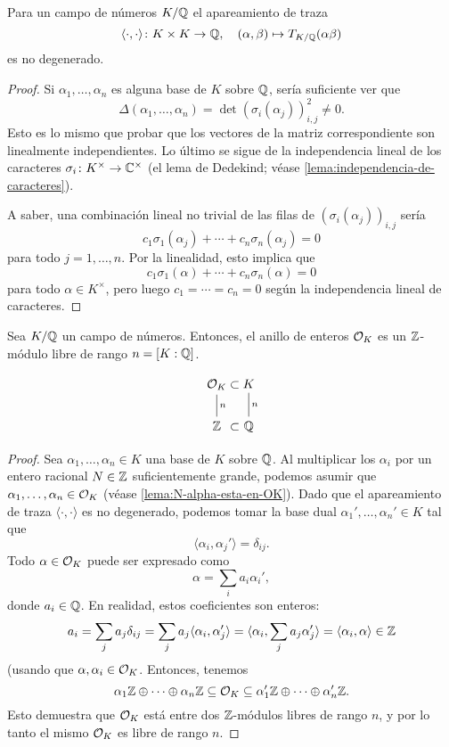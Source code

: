 \begin{proposicion}
  Para un campo de números $K/\mathbb{Q}$ el apareamiento de traza
  \[ \langle\cdot,\cdot\rangle\colon K\times K \to \mathbb{Q}, \quad
     (\alpha,\beta) \mapsto T_{K/\mathbb{Q}} (\alpha\beta) \]
  es no degenerado.

  \begin{proof}
    Si $\alpha_1,\ldots,\alpha_n$ es alguna base de $K$ sobre $\mathbb{Q}$,
    sería suficiente ver que
    \[ \Delta (\alpha_1,\ldots,\alpha_n) =
       \det (\sigma_i (\alpha_j))_{i,j}^2 \ne 0. \]
    Esto es lo mismo que probar que los vectores de la matriz correspondiente
    son linealmente independientes. Lo último se sigue de la independencia
    lineal de los caracteres $\sigma_i\colon K^\times \to \mathbb{C}^\times$
    (el lema de Dedekind; véase \ref{lema:independencia-de-caracteres}).

    A saber, una combinación lineal no trivial de las filas de
    $(\sigma_i (\alpha_j))_{i,j}$ sería
    $$c_1 \sigma_1 (\alpha_j) + \cdots + c_n \sigma_n (\alpha_j) = 0$$
    para todo $j = 1,\ldots,n$. Por la linealidad, esto implica que
    $$c_1 \sigma_1 (\alpha) + \cdots + c_n \sigma_n (\alpha) = 0$$
    para todo $\alpha \in K^\times$, pero luego
    $c_1 = \cdots = c_n = 0$ según la independencia lineal de caracteres.
  \end{proof}
\end{proposicion}

\begin{teorema}
  Sea $K/\mathbb{Q}$ un campo de números. Entonces, el anillo de enteros $\mathcal{O}_K$
  es un $\mathbb{Z}$-módulo libre de rango $n = [K : \mathbb{Q}]$.

  \[ \begin{tikzcd}
    \O_K \ar[-]{d}{n} &[-3em] \subset &[-3em] K \ar[-]{d}{n} \\
    \ZZ & \subset & \QQ
  \end{tikzcd} \]

  \begin{proof}
    Sea $\alpha_1,\ldots,\alpha_n \in K$ una base de $K$ sobre $\mathbb{Q}$.
    Al multiplicar los $\alpha_i$ por un entero racional $N \in \mathbb{Z}$
    suficientemente grande, podemos asumir que
    $\alpha_1,\ldots,\alpha_n \in \mathcal{O}_K$ (véase \ref{lema:N-alpha-esta-en-OK}).
    Dado que el apareamiento de traza $\langle\cdot,\cdot\rangle$
    es no degenerado, podemos tomar la base dual
    $\alpha_1',\ldots,\alpha_n' \in K$ tal que
    $$\langle \alpha_i, \alpha_j'\rangle = \delta_{ij}.$$
    Todo $\alpha \in \mathcal{O}_K$ puede ser expresado como
    $$\alpha = \sum_i a_i \alpha_i',$$
    donde $a_i \in \mathbb{Q}$. En realidad, estos coeficientes son enteros:
    \[ a_i = \sum_j a_j \delta_{ij} =
       \sum_j a_j \langle\alpha_i, \alpha_j'\rangle =
       \langle\alpha_i, \sum_j a_j \alpha_j'\rangle =
       \langle\alpha_i, \alpha\rangle \in \mathbb{Z} \]
    (usando que $\alpha,\alpha_i \in \mathcal{O}_K$. Entonces, tenemos
    \[ \alpha_1 \mathbb{Z} \oplus \cdots \oplus \alpha_n \mathbb{Z} \subseteq \mathcal{O}_K \subseteq
       \alpha_1' \mathbb{Z} \oplus \cdots \oplus \alpha_n' \mathbb{Z}. \]
    Esto demuestra que $\mathcal{O}_K$ está entre dos $\mathbb{Z}$-módulos libres de rango $n$,
    y por lo tanto el mismo $\mathcal{O}_K$ es libre de rango $n$.
  \end{proof}
\end{teorema}

